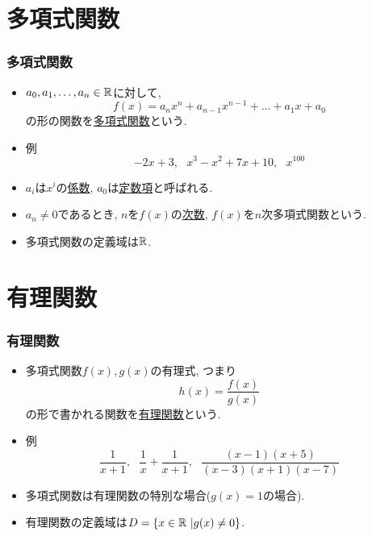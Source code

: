 
\section{多項式関数}


\begin{frame}
\frametitle{多項式関数}

\begin{itemize}
\item 
$a_0,a_1,\dots,a_n \in \mathbb{R}$に対して, 
$$
f(x)=a_nx^n+a_{n-1}x^{n-1}+\dots+a_1x+a_0
$$
の形の関数を\underline{多項式関数}という. 
\item 例
$$
-2x+3, \ \ \ x^3-x^2+7x+10, \ \ \ x^{100} 
$$
\item $a_i$は$x^i$の\underline{係数}, $a_0$は\underline{定数項}と呼ばれる. 
\item $a_n \neq 0$であるとき, $n$を$f(x)$の\underline{次数}, $f(x)$を$n$次多項式関数という. 
\item 多項式関数の定義域は$\mathbb{R}$. 
\end{itemize}

\end{frame}





\section{有理関数}

\begin{frame}
\frametitle{有理関数}

\begin{itemize}
\item 
多項式関数$f(x),g(x)$の有理式, つまり
$$
h(x)=\frac{f(x)}{g(x)}
$$
の形で書かれる関数を\underline{有理関数}という. 
\item 例
$$
\frac{1}{x+1}, \ \ \ \frac{1}{x}+\frac{1}{x+1}, \ \ \ \frac{(x-1)(x+5)}{(x-3)(x+1)(x-7)}
$$
\item 多項式関数は有理関数の特別な場合($g(x)=1$の場合). 
\item 有理関数の定義域は$D=\{ x \in \mathbb{R} \ | g(x) \neq 0\}$.
\end{itemize}

\end{frame}



